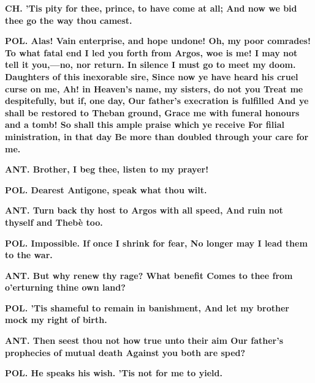 \documentclass[11pt,letter]{book}
\begin{document}
\par \textbf{CH. ’Tis pity for thee, prince, to have come at all; And now we bid thee go the way thou camest.}
\par 

\par \textbf{POL. Alas! Vain enterprise, and hope undone! Oh, my poor comrades! To what fatal end I led you forth from Argos, woe is me! I may not tell it you,—no, nor return. In silence I must go to meet my doom. Daughters of this inexorable sire, Since now ye have heard his cruel curse on me, Ah! in Heaven’s name, my sisters, do not you Treat me despitefully, but if, one day, Our father’s execration is fulfilled And ye shall be restored to Theban ground, Grace me with funeral honours and a tomb! So shall this ample praise which ye receive For filial ministration, in that day Be more than doubled through your care for me.}
\par 

\par \textbf{ANT. Brother, I beg thee, listen to my prayer!}
\par 

\par \textbf{POL. Dearest Antigone, speak what thou wilt.}
\par 

\par \textbf{ANT. Turn back thy host to Argos with all speed, And ruin not thyself and Thebè too.}
\par 

\par \textbf{POL. Impossible. If once I shrink for fear, No longer may I lead them to the war.}
\par 

\par \textbf{ANT. But why renew thy rage? What benefit Comes to thee from o’erturning thine own land?}
\par 

\par \textbf{POL. ’Tis shameful to remain in banishment, And let my brother mock my right of birth.}
\par 

\par \textbf{ANT. Then seest thou not how true unto their aim Our father’s prophecies of mutual death Against you both are sped?}
\par 

\par \textbf{POL. He speaks his wish. ’Tis not for me to yield.}
\par 
\end{document}
